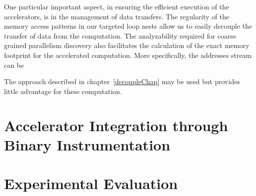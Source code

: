 One particular important aspect, in ensuring the efficient execution of the accelerators, is in the management of data transfers. 
The regularity of the memory access patterns in our targeted loop nests
allow us  to easily decouple the transfer of data from the computation. 
The analyzability required for coarse grained parallelism discovery also
facilitates the calculation of the exact memory footprint for the accelerated computation. More specifically, the addresses stream can be 


The approach described in chapter~\ref{decoupleChap} may be used but provides little advantage for these computation. 

\newpage


\newpage
\newpage
\section{Accelerator Integration through Binary Instrumentation}
\newpage

\section{Experimental Evaluation }
\label{biev}












